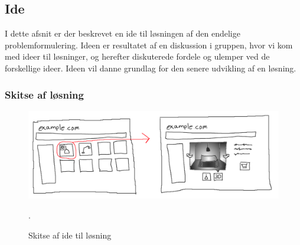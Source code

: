 \subsection{Ide}

I dette afsnit er der beskrevet en ide til løsningen af den endelige problemformulering. Ideen er resultatet af en diskussion i gruppen, hvor vi kom med ideer til løsninger, og herefter diskuterede fordele og ulemper ved de forskellige ideer. 
Ideen vil danne grundlag for den senere udvikling af en løsning.

\subsubsection{Skitse af løsning}

\begin{figure}[H]
   \centering
   \includegraphics[width=\textwidth]{../graphics/skitse_til_loesning}
   \caption{Skitse af ide til løsning}.
\end{figure}

